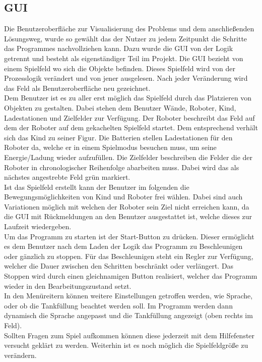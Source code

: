 \subsection{GUI}
Die Benutzeroberfläche zur Visualisierung des Problems und dem anschließenden Lösungsweg, wurde so gewählt das der Nutzer zu jedem Zeitpunkt die Schritte das Programmes nachvollziehen kann. Dazu wurde die GUI von der Logik getrennt und besteht als eigenständiger Teil im Projekt. Die GUI bezieht von einem Spielfeld wo sich die Objekte befinden. Dieses Spielfeld wird von der Prozesslogik verändert und von jener ausgelesen. Nach jeder Veränderung wird das Feld als Benutzeroberfläche neu gezeichnet. \\
Dem Benutzer ist es zu aller erst möglich das Spielfeld durch das Platzieren von Objekten zu gestalten. Dabei stehen dem Benutzer Wände, Roboter, Kind, Ladestationen und Zielfelder zur Verfügung. Der Roboter beschreibt das Feld auf dem der Roboter auf dem gekachelten Spielfeld startet. Dem entsprechend verhält sich das Kind zu seiner Figur. Die Batterien stellen Ladestationen für den Roboter da, welche er in einem Spielmodus besuchen muss, um seine Energie/Ladung wieder aufzufüllen. Die Zielfelder beschreiben die Felder die der Roboter in chronologischer Reihenfolge abarbeiten muss. Dabei wird das als nächstes angestrebte Feld grün markiert. \\
Ist das Spielfeld erstellt kann der Benutzer im folgenden die Bewegungsmöglichkeiten von Kind und Roboter frei wählen. Dabei sind auch Variationen möglich mit welchen der Roboter sein Ziel nicht erreichen kann, da die GUI mit Rückmeldungen an den Benutzer ausgestattet ist, welche dieses zur Laufzeit wiedergeben. \\
Um das Programm zu starten ist der Start-Button zu drücken. Dieser ermöglicht es dem Benutzer nach dem Laden der Logik das Programm zu Beschleunigen oder gänzlich zu stoppen. Für das Beschleunigen steht ein Regler zur Verfügung, welcher die Dauer zwischen den Schritten beschränkt oder verlängert. Das Stoppen wird durch einen gleichnamigen Button realisiert, welcher das Programm wieder in den Bearbeitungszustand setzt. \\
In den Menüreitern können weitere Einstellungen getroffen werden, wie Sprache, oder ob die Tankfüllung beachtet werden soll. Im Programm werden dann dynamisch die Sprache angepasst und die Tankfüllung angezeigt (oben rechts im Feld). \\
Sollten Fragen zum Spiel aufkommen können diese jederzeit mit dem Hilfefenster versucht geklärt zu werden. Weiterhin ist es noch möglich die Spielfeldgröße zu verändern. \\